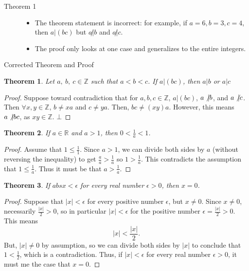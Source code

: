 \documentclass[8pt]{extarticle}
\title{}
\author{Avinash Iyer}
\date{}
\newtheorem{theorem}{Theorem}
\newcommand{\Z}{\mathbb{Z}}
\begin{document}
  \begin{description}
    \item[Theorem 1] \hfill
      \begin{itemize}
        \item The theorem statement is incorrect: for example, if $a=6,b=3,c=4$, then $a|(bc)$ but $a\not| b$ and $a\not|c$.
        \item The proof only looks at one case and generalizes to the entire integers.
      \end{itemize}
  \end{description}
  \begin{problem}{Corrected Theorem and Proof}
    \begin{theorem}
      Let $a,~b,~c\in \Z$ such that $a<b<c$. If $a|(bc)$, then $a|b$ or $a|c$
    \end{theorem}
    \begin{proof}
      Suppose toward contradiction that for  $a,b,c\in\Z$, $a \vert (bc)$, $a\not\vert b$, and $a\not\vert c$. Then $\forall x,y\in\Z$, $b\neq xa$ and $c \neq ya$. Then, $bc \neq (xy)a$. However, this means $a \not\vert bc$, as $xy\in\Z$. $\bot$
    \end{proof}
  \end{problem}
  \begin{theorem}
  If $a \in \mathbb{R}$ and $a>1$, then $0 < \displaystyle \frac{1}{a} <1$.
  \end{theorem}
  \begin{proof}
      Assume that $1 \le \displaystyle \frac{1}{1}$. Since $a>1$, we can divide both sides by $a$ (without reversing the inequality) to get $\displaystyle \frac{a}{a} > \displaystyle \frac{1}{a}$ so $1 > \displaystyle \frac{1}{a}$. This contradicts the assumption that 
      $1 \le \displaystyle \frac{1}{a}$. Thus it must be that $a> \displaystyle \frac{1}{a}$.
  \end{proof}

  \begin{theorem}
      If $abs{x} < \epsilon$ for every real number $\epsilon >0$, then $x=0$.
  \end{theorem}
  \begin{proof}
      Suppose that $|x|< \epsilon$ for every positive number $\epsilon$, but $x \neq 0$.
      Since $x \neq 0$, necessarily $\displaystyle \frac{|x|}{2}>0$, so in particular $|x| < \epsilon$ for the positive number $\epsilon=\displaystyle \frac{|x|}{2}>0$. This means
      $$ |x| < \displaystyle \frac{|x|}{2}.$$
      But, $|x| \neq 0$ by assumption, so we can divide both sides by $|x|$ to conclude that $1 < \frac{1}{2}$, which is a contradiction. Thus, if $|x| < \epsilon$ for every real number $\epsilon >0$, it must me the case that $x=0$.
  \end{proof}
\end{document}
